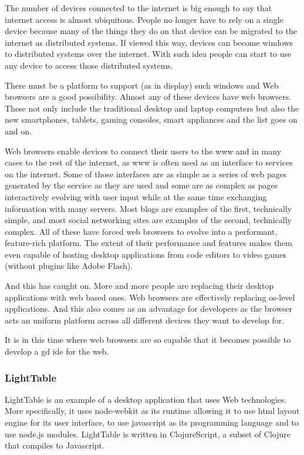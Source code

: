 \documentclass{./llncs2e/llncs}
\begin{document}
	The number of devices connected to the internet is big enough to say that internet access is almost ubiquitous.
	People no longer have to rely on a single device because many of the things they do on that device can be migrated to the internet as distributed systems.
	If viewed this way, devices can become windows to distributed systems over the internet.
	With such idea people can start to use any device to access those distributed systems.

	There must be a platform to support (as in display) such windows and Web browsers are a good possibility.
	Almost any of these devices have web browsers.
	These not only include the traditional desktop and laptop computers but also the new smartphones, tablets, gaming consoles, smart appliances and the list goes on and on.

	Web browsers enable devices to connect their users to the \ac{www} and in many cases to the rest of the internet, as \ac{www} is often used as an interface to services on the internet.
	Some of those interfaces are as simple as a series of web pages generated by the service as they are used and some are as complex as pages interactively evolving with user input while at the same time exchanging information with many servers.
	Most blogs are examples of the first, technically simple, and most social networking sites are examples of the second, technically complex.
	All of these have forced web browsers to evolve into a performant, feature-rich platform.
	The extent of their performance and features makes them even capable of hosting desktop applications from code editors to video games (without plugins like Adobe Flash).

	And this has caught on.
	More and more people are replacing their desktop applications with web based ones.
	Web browsers are effectively replacing \ac{os}-level applications.
	And this also comes as an advantage for developers as the browser acts an uniform platform across all different devices they want to develop for.

	It is in this time where web browsers are so capable that it becomes possible to develop a \ac{gd} \ac{ide} for the web.

\subsubsection{LightTable}
	LightTable is an example of a desktop application that uses Web technologies.
	More specifically, it uses node-webkit as its runtime allowing it to use html layout engine for its user interface, to use javascript as its programming language and to use node.js\cite{tilkov2010node} modules.
	LightTable is written in ClojureScript\cite{10.1109/MIC.2011.148}, a subset of Clojure that compiles to Javascript.
\end{document}
